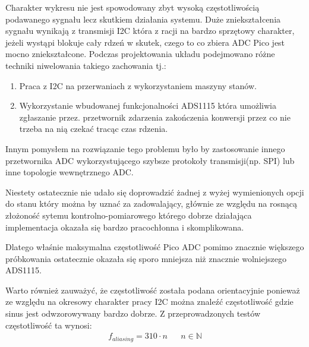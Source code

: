    Charakter wykresu nie jest spowodowany zbyt wysoką częstotliwością podawanego
    sygnału lecz skutkiem działania systemu. Duże zniekształcenia sygnału wynikają
    z transmisji I2C która z racji na bardzo sprzętowy charakter, jeżeli wystąpi blokuje
    cały rdzeń w skutek, czego to co zbiera ADC Pico jest mocno zniekształcone.
    Podczas projektowania układu podejmowano różne techniki niwelowania takiego zachowania tj.: 
    \begin{enumerate}
        \item Praca z I2C na przerwaniach z wykorzystaniem maszyny stanów.
        \item Wykorzystanie wbudowanej funkcjonalności ADS1115 która umożliwia zgłaszanie przez.
        przetwornik zdarzenia zakończenia konwersji przez co nie trzeba na nią czekać tracąc czas
        rdzenia.
    \end{enumerate}

    Innym pomysłem na rozwiązanie tego problemu było by zastosowanie innego przetwornika ADC wykorzystującego szybsze protokoły transmisji(np. SPI)
    lub inne topologie wewnętrznego ADC.

    Niestety ostatecznie nie udało się doprowadzić żadnej z wyżej wymienionych opcji do stanu
    który można by uznać za zadowalający, głównie ze względu na rosnącą złożoność sytemu kontrolno-pomiarowego
    którego dobrze działająca implementacja okazała się bardzo pracochłonna i skomplikowana.
    
    Dlatego właśnie maksymalna częstotliwość Pico ADC pomimo znacznie większego
    próbkowania ostatecznie okazała się sporo mniejsza niż znacznie wolniejszego ADS1115.  

    Warto również zauważyć, że częstotliwość została podana orientacyjnie ponieważ ze względu
    na okresowy charakter pracy I2C można znaleźć częstotliwość gdzie sinus jest odwzorowywany bardzo dobrze.
    Z przeprowadzonych testów częstotliwość ta wynosi:
    \begin{align}
        f_{aliasing} = 310 \cdot n && n \in \mathbb{N}
    \end{align}